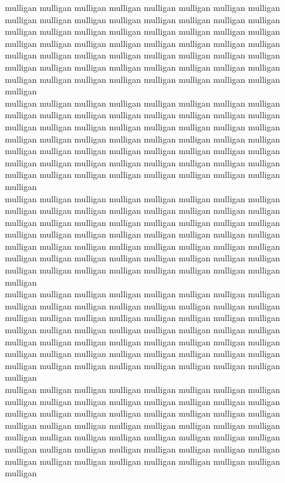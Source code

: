 mulligan mulligan mulligan mulligan mulligan mulligan mulligan mulligan mulligan mulligan mulligan mulligan mulligan mulligan mulligan mulligan mulligan mulligan mulligan mulligan mulligan mulligan mulligan mulligan mulligan mulligan mulligan mulligan mulligan mulligan mulligan mulligan mulligan mulligan mulligan mulligan mulligan mulligan mulligan mulligan mulligan mulligan mulligan mulligan mulligan mulligan mulligan mulligan mulligan mulligan mulligan mulligan mulligan mulligan mulligan mulligan mulligan\\
mulligan mulligan mulligan mulligan mulligan mulligan mulligan mulligan mulligan mulligan mulligan mulligan mulligan mulligan mulligan mulligan mulligan mulligan mulligan mulligan mulligan mulligan mulligan mulligan mulligan mulligan mulligan mulligan mulligan mulligan mulligan mulligan mulligan mulligan mulligan mulligan mulligan mulligan mulligan mulligan mulligan mulligan mulligan mulligan mulligan mulligan mulligan mulligan mulligan mulligan mulligan mulligan mulligan mulligan mulligan mulligan mulligan\\
mulligan mulligan mulligan mulligan mulligan mulligan mulligan mulligan mulligan mulligan mulligan mulligan mulligan mulligan mulligan mulligan mulligan mulligan mulligan mulligan mulligan mulligan mulligan mulligan mulligan mulligan mulligan mulligan mulligan mulligan mulligan mulligan mulligan mulligan mulligan mulligan mulligan mulligan mulligan mulligan mulligan mulligan mulligan mulligan mulligan mulligan mulligan mulligan mulligan mulligan mulligan mulligan mulligan mulligan mulligan mulligan mulligan\\
mulligan mulligan mulligan mulligan mulligan mulligan mulligan mulligan mulligan mulligan mulligan mulligan mulligan mulligan mulligan mulligan mulligan mulligan mulligan mulligan mulligan mulligan mulligan mulligan mulligan mulligan mulligan mulligan mulligan mulligan mulligan mulligan mulligan mulligan mulligan mulligan mulligan mulligan mulligan mulligan mulligan mulligan mulligan mulligan mulligan mulligan mulligan mulligan mulligan mulligan mulligan mulligan mulligan mulligan mulligan mulligan mulligan\\
mulligan mulligan mulligan mulligan mulligan mulligan mulligan mulligan mulligan mulligan mulligan mulligan mulligan mulligan mulligan mulligan mulligan mulligan mulligan mulligan mulligan mulligan mulligan mulligan mulligan mulligan mulligan mulligan mulligan mulligan mulligan mulligan mulligan mulligan mulligan mulligan mulligan mulligan mulligan mulligan mulligan mulligan mulligan mulligan mulligan mulligan mulligan mulligan mulligan mulligan mulligan mulligan mulligan mulligan mulligan mulligan mulligan\\
